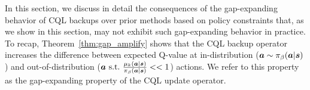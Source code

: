 
In this section, we discuss in detail the consequences of the gap-expanding behavior of CQL backups over prior methods based on policy constraints that, as we show in this section, may not exhibit such gap-expanding behavior in practice. To recap, Theorem~\ref{thm:gap_amplify} shows that the CQL backup operator increases the difference between expected Q-value at in-distribution ($\boldsymbol{a} \sim {\pi_\beta}(\boldsymbol{a}|\boldsymbol{s})$) and out-of-distribution ($\boldsymbol{a} \text{~s.t.~} \frac{\mu_k(\boldsymbol{a}|\boldsymbol{s})}{{\pi_\beta}(\boldsymbol{a}|\boldsymbol{s})} << 1$) actions. We refer to this property as the gap-expanding property of the CQL update operator.




